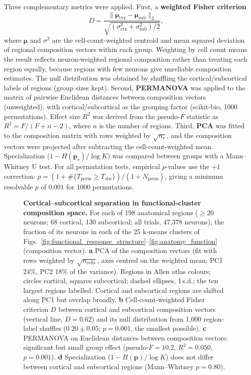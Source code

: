   Three complementary metrics were applied.
  First, a \textbf{weighted Fisher criterion}
  \begin{equation}
      D = \frac{\|\boldsymbol{\mu}_{\mathrm{ctx}} -
                 \boldsymbol{\mu}_{\mathrm{sub}}\|_2}
               {\sqrt{(\sigma^2_{\mathrm{ctx}} +
                       \sigma^2_{\mathrm{sub}})/2}},
  \end{equation}
  where $\boldsymbol{\mu}$ and $\sigma^2$ are the cell-count-weighted centroid
  and mean squared deviation of regional composition vectors within each group.
  Weighting by cell count means the result reflects neuron-weighted regional
  composition rather than treating each region equally, because regions with few
  neurons give unreliable composition estimates. The null distribution was obtained
  by shuffling the cortical/subcortical labels of regions (group sizes kept).
  Second, \textbf{PERMANOVA} \citep{Anderson2001} was applied to the matrix of
  pairwise Euclidean distances between composition vectors (unweighted), with
  cortical/subcortical as the grouping factor (scikit-bio, 1000 permutations).
  Effect size $R^2$ was derived from the pseudo-$F$ statistic as
  $R^2 = F / (F + n - 2)$, where $n$ is the number of regions.
  Third, \textbf{PCA} was fitted to the composition matrix with rows weighted by
  $\sqrt{n_r}$, and the composition vectors were projected after subtracting the
  cell-count-weighted mean. Specialization ($1-H(\mathbf{p}_r)/\log K$) was compared
  between groups with a Mann--Whitney U test.
  For all permutation tests, empirical $p$-values use the $+1$ correction:
  $p = (1 + \#\{T_{\mathrm{perm}} \geq T_{\mathrm{obs}}\}) /
       (1 + N_{\mathrm{perm}})$,
  giving a minimum resolvable $p$ of $0.001$ for 1000 permutations.

\begin{figure}[h]
\caption{\textbf{Cortical--subcortical separation in functional-cluster composition space.}
For each of 198 anatomical regions ($\geq$20 neurons; 68 cortical, 130 subcortical; all trials, 47,378 neurons), the fraction of its neurons in each of the 25 k-means clusters of Figs.~\ref{fig:functional_response_structure}--\ref{fig:anatomy_function} (composition vector).
\textbf{a} PCA of the composition vectors (fit with rows weighted by $\sqrt{n_\mathrm{cells}}$, axes centred on the weighted mean; PC1 24\%, PC2 18\% of the variance). Regions in Allen atlas colours; circles cortical, squares subcortical; dashed ellipses, 1\,s.d.; the ten largest regions labelled. Cortical and subcortical regions are shifted along PC1 but overlap broadly.
\textbf{b} Cell-count-weighted Fisher criterion $D$ between cortical and subcortical composition vectors (vertical line, $D=0.62$) and its null distribution from 1,000 region-label shuffles ($0.20\pm0.05$; $p=0.001$, the smallest possible).
\textbf{c} PERMANOVA on Euclidean distances between composition vectors: significant but small group effect (pseudo-$F=10.2$, $R^2=0.050$, $p=0.001$).
\textbf{d} Specialization ($1-H(\mathbf{p})/\log K$) does not differ between cortical and subcortical regions (Mann--Whitney $p=0.80$).}
\label{fig:cortical_subcortical_specialization}
\end{figure}

